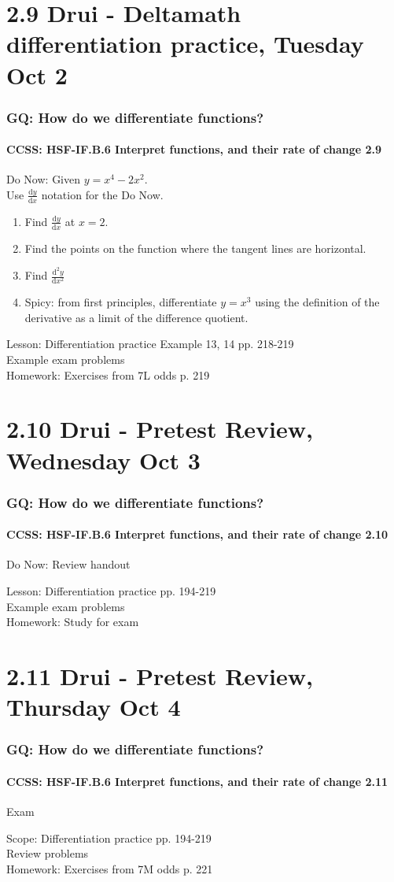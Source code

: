 \documentclass{beamer}
\begin{document}
\section{2.9 Drui - Deltamath differentiation practice, Tuesday Oct 2}
  \frame
  {
    \frametitle{GQ: How do we differentiate functions?}
    \framesubtitle{CCSS: HSF-IF.B.6 Interpret functions, and their rate of change  \alert{2.9}}

    \begin{block}{Do Now: Given $y= x^4-2x^2$. \\Use $\frac{\mathrm{d}y}{\mathrm{d}x}$ notation for the Do Now.}
      \begin{enumerate}
      \item Find $\frac{\mathrm{d}y}{\mathrm{d}x}$ at $x=2$.
      \item Find the points on the function where the tangent lines are horizontal.
      \item Find $\frac{\mathrm{d}^2y}{\mathrm{d}x^2}$
      \item Spicy: from first principles, differentiate $y=x^3$ using the definition of the derivative as a limit of the difference quotient.
      \end{enumerate}
   \end{block}
    Lesson: Differentiation practice Example 13, 14 pp. 218-219\\
    Example exam problems\\ \bigskip
    Homework: Exercises from 7L odds p. 219
  }

\section{2.10 Drui - Pretest Review, Wednesday Oct 3}
  \frame
  {
    \frametitle{GQ: How do we differentiate functions?}
    \framesubtitle{CCSS: HSF-IF.B.6 Interpret functions, and their rate of change  \alert{2.10}}

    \begin{block}{Do Now: Review handout}
    \end{block}
    Lesson: Differentiation practice pp. 194-219\\
    Example exam problems\\ \bigskip
    Homework: Study for exam
  }

\section{2.11 Drui - Pretest Review, Thursday Oct 4}
  \frame
  {
    \frametitle{GQ: How do we differentiate functions?}
    \framesubtitle{CCSS: HSF-IF.B.6 Interpret functions, and their rate of change  \alert{2.11}}

    \begin{block}{Exam}
    \end{block}
    Scope: Differentiation practice pp. 194-219\\
    Review problems\\ \bigskip
    Homework: Exercises from 7M odds p. 221
  }
\end{document}
